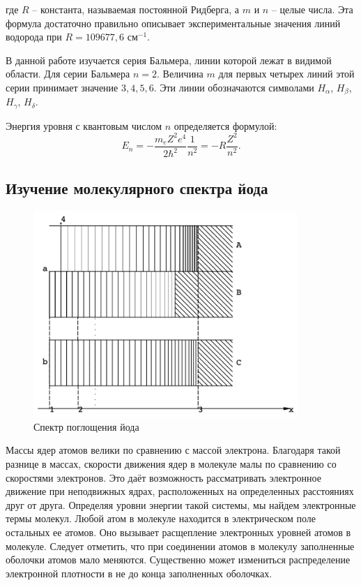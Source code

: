 \documentclass[12pt,a4paper]{article}
\begin{document}
	\noindent где $R$ -- константа, называемая постоянной Ридберга, а $m$ и $n$ -- целые числа. Эта формула достаточно правильно описывает экспериментальные значения линий водорода при $R = 109 677,6$ см$^{-1}$.
	
	В данной работе изучается серия Бальмера, линии которой лежат в видимой области. Для серии Бальмера $n = 2$. Величина $m$ для первых четырех линий этой серии принимает значение $3, 4, 5, 6$. Эти линии обозначаются символами $H_\alpha$, $H_\beta$, $H_\gamma$, $H_\delta$.
	
	Энергия уровня с квантовым числом $n$ определяется формулой:
	\begin{equation}
		E_n = -\frac{m_e Z^2 e^4}{2\hbar^2}\frac{1}{n^2} = -R\frac{Z^2}{n^2}.
	\end{equation}

    \subsection*{Изучение молекулярного спектра йода}

 	\begin{figure}[h!]
		\centering
		\includegraphics[width=10cm]{src/iodine.png}
		\caption{Спектр поглощения йода}
        \label{fig:iodine}
	\end{figure}
 
	Массы ядер атомов велики по сравнению с массой электрона. Благодаря такой разнице в массах, скорости движения ядер в молекуле малы по сравнению со скоростями электронов. Это даёт возможность	рассматривать электронное движение при неподвижных ядрах, расположенных на определенных расстояниях друг от друга. Определяя уровни энергии такой системы, мы найдем электронные термы молекул. Любой атом в молекуле находится в электрическом поле остальных ее атомов. Оно вызывает расщепление электронных уровней атомов в молекуле. Следует отметить, что при соединении атомов в молекулу заполненные оболочки атомов мало меняются. Существенно может измениться распределение электронной плотности в не до конца заполненных оболочках.
	
\end{document}

